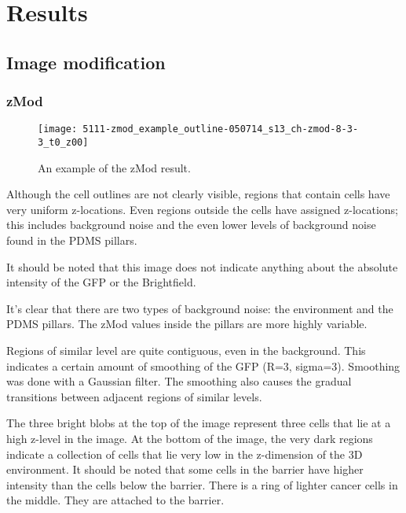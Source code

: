 
\chapter{Results}

\ifpdf
    \graphicspath{{Chapter6/Figs/Raster/}{Chapter6/Figs/PDF/}{Chapter6/Figs/}}
\else
    \graphicspath{{Chapter6/Figs/Vector/}{Chapter6/Figs/}}
\fi

\section{Image modification}

\subsection{zMod}

\begin{figure}[htbp!]
\centering
\texttt{[image: 5111-zmod\_example\_outline-050714\_s13\_ch-zmod-8-3-3\_t0\_z00]}
\caption[zMod example]{An example of the zMod result.}
\label{fig:zmod_result}
\end{figure}

Although the cell outlines are not clearly visible, regions that contain cells have very uniform z-locations. Even regions outside the cells have assigned z-locations; this includes background noise and the even lower levels of background noise found in the PDMS pillars.

It should be noted that this image does not indicate anything about the absolute intensity of the GFP or the Brightfield.

It's clear that there are two types of background noise: the environment and the PDMS pillars. The zMod values inside the pillars are more highly variable.

Regions of similar level are quite contiguous, even in the background. This indicates a certain amount of smoothing of the GFP (R=3, sigma=3). Smoothing was done with a Gaussian filter. The smoothing also causes the gradual transitions between adjacent regions of similar levels.

The three bright blobs at the top of the image represent three cells that lie at a high z-level in the image. At the bottom of the image, the very dark regions indicate a collection of cells that lie very low in the z-dimension of the 3D environment. It should be noted that some cells in the barrier have higher intensity than the cells below the barrier. There is a ring of lighter cancer cells in the middle. They are attached to the barrier.

